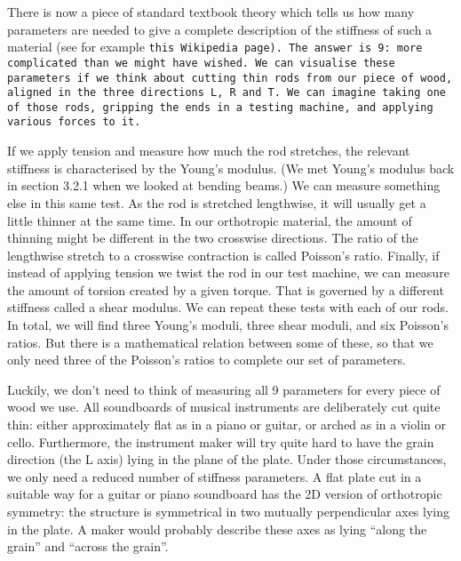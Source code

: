
  There is now a piece of standard textbook theory which tells us how many 
  parameters are needed to give a complete description of the stiffness of such 
  a material (see for example \tt{}this Wikipedia page\rm{}). The answer is 9: 
  more complicated than we might have wished. We can visualise these parameters 
  if we think about cutting thin rods from our piece of wood, aligned in the 
  three directions L, R and T. We can imagine taking one of those rods, 
  gripping the ends in a testing machine, and applying various forces to it. 

  If we apply tension and measure how much the rod stretches, the relevant 
  stiffness is characterised by the Young’s modulus. (We met Young’s modulus 
  back in section 3.2.1 when we looked at bending beams.) We can measure 
  something else in this same test. As the rod is stretched lengthwise, it will 
  usually get a little thinner at the same time. In our orthotropic material, 
  the amount of thinning might be different in the two crosswise directions. 
  The ratio of the lengthwise stretch to a crosswise contraction is called 
  Poisson’s ratio. Finally, if instead of applying tension we twist the rod in 
  our test machine, we can measure the amount of torsion created by a given 
  torque. That is governed by a different stiffness called a shear modulus. We 
  can repeat these tests with each of our rods. In total, we will find three 
  Young's moduli, three shear moduli, and six Poisson's ratios. But there is a 
  mathematical relation between some of these, so that we only need three of 
  the Poisson's ratios to complete our set of parameters. 

  Luckily, we don’t need to think of measuring all 9 parameters for every piece 
  of wood we use. All soundboards of musical instruments are deliberately cut 
  quite thin: either approximately flat as in a piano or guitar, or arched as 
  in a violin or cello. Furthermore, the instrument maker will try quite hard 
  to have the grain direction (the L axis) lying in the plane of the plate. 
  Under those circumstances, we only need a reduced number of stiffness 
  parameters. A flat plate cut in a suitable way for a guitar or piano 
  soundboard has the 2D version of orthotropic symmetry: the structure is 
  symmetrical in two mutually perpendicular axes lying in the plate. A maker 
  would probably describe these axes as lying “along the grain” and “across the 
  grain”. 

